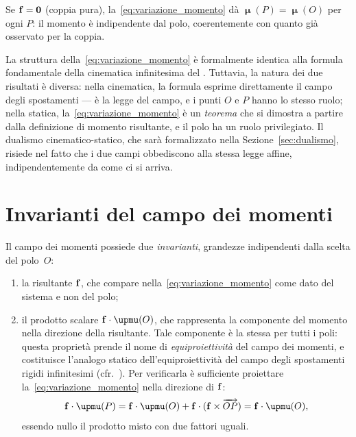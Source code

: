 \begin{oss}
	Se $\mathbf{f} = \mathbf{0}$ (coppia pura),
	la~\eqref{eq:variazione_momento} dà
	$\bm{\upmu}(P) = \bm{\upmu}(O)$ per ogni $P$: il momento è
	indipendente dal polo, coerentemente con quanto già
	osservato per la coppia.
\end{oss}

\begin{oss}
	La struttura della~\eqref{eq:variazione_momento} è
	formalmente identica alla formula fondamentale della
	cinematica infinitesima del . Tuttavia, la
	natura dei due risultati è diversa: nella cinematica, la
	formula esprime direttamente il campo degli spostamenti ---
	è la legge del campo, e i punti $O$ e $P$ hanno lo stesso
	ruolo; nella statica, la~\eqref{eq:variazione_momento} è un
	\textit{teorema} che si dimostra a partire dalla definizione
	di momento risultante, e il polo ha un ruolo privilegiato.
	Il dualismo cinematico-statico, che sarà formalizzato nella
	Sezione~\ref{sec:dualismo}, risiede nel fatto che i due
	campi obbediscono alla stessa legge affine, indipendentemente
	da come ci si arriva.
\end{oss}

\section{Invarianti del campo dei momenti}	\label{sec:invarianti_F}

Il campo dei momenti possiede due \textit{invarianti},
grandezze indipendenti dalla scelta del polo~$O$:
\begin{enumerate}[label=(\roman*)]
	\item la risultante $\mathbf{f}$, che compare
	nella~\eqref{eq:variazione_momento} come dato del sistema
	e non del polo;
	\item il prodotto scalare $\fb \cdot \bm{\upmu}(O)$, che 
	rappresenta la componente del momento nella direzione 
	della risultante. Tale componente è la stessa per tutti 
	i poli: questa proprietà prende il nome di 
	\textit{equiproiettività} del campo dei momenti, e 
	costituisce l'analogo statico dell'equiproiettività del 
	campo degli spostamenti rigidi infinitesimi 
	(cfr.~). Per 
	verificarla è sufficiente proiettare 
	la~\eqref{eq:variazione_momento} nella direzione di $\mathbf{f}$:
	\begin{equation}
		\fb \cdot \bm{\upmu}(P)
		= \fb \cdot \bm{\upmu}(O)
		+ \fb \cdot (\fb \times \overrightarrow{OP})
		= \fb \cdot \bm{\upmu}(O),
	\end{equation}
	essendo nullo il prodotto misto con due fattori uguali.
\end{enumerate}

